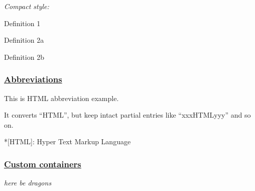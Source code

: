 \documentclass[
  paper=a4,
  ,captions=tableheading
]{scrartcl}
\providecommand{\tightlist}{%
  \setlength{\itemsep}{0pt}\setlength{\parskip}{0pt}}
\begin{document}
\emph{Compact style:}

\begin{description}
\tightlist
\item[Term 1]
Definition 1
\item[Term 2]
Definition 2a

Definition 2b
\end{description}

\hypertarget{abbreviations}{%
\subsubsection{\texorpdfstring{\href{https://github.com/markdown-it/markdown-it-abbr}{Abbreviations}}{Abbreviations}}\label{abbreviations}}

This is HTML abbreviation example.

It converts ``HTML'', but keep intact partial entries like
``xxxHTMLyyy'' and so on.

*{[}HTML{]}: Hyper Text Markup Language

\hypertarget{custom-containers}{%
\subsubsection{\texorpdfstring{\href{https://github.com/markdown-it/markdown-it-container}{Custom
containers}}{Custom containers}}\label{custom-containers}}

\emph{here be dragons}
\end{document}
